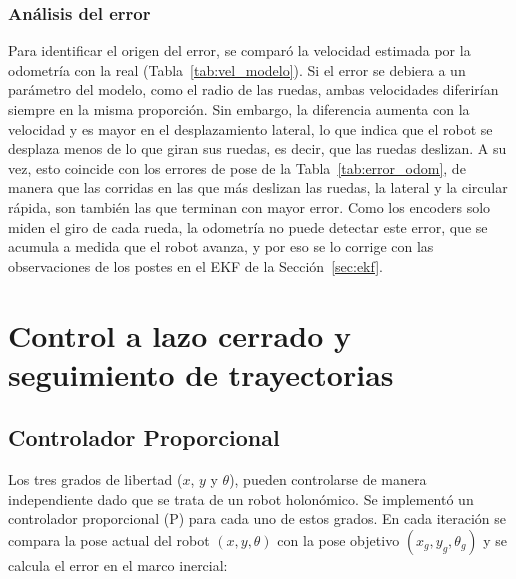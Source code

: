 \documentclass[11pt,a4paper]{article}
\begin{document}
\subsubsection{Análisis del error}

Para identificar el origen del error, se comparó la velocidad estimada por la odometría con la real (Tabla~\ref{tab:vel_modelo}). Si el error se debiera a un parámetro del modelo, como el radio de las ruedas, ambas velocidades diferirían siempre en la misma proporción. Sin embargo, la diferencia aumenta con la velocidad y es mayor en el desplazamiento lateral, lo que indica que el robot se desplaza menos de lo que giran sus ruedas, es decir, que las ruedas deslizan. A su vez, esto coincide con los errores de pose de la Tabla~\ref{tab:error_odom}, de manera que las corridas en las que más deslizan las ruedas, la lateral y la circular rápida, son también las que terminan con mayor error. Como los encoders solo miden el giro de cada rueda, la odometría no puede detectar este error, que se acumula a medida que el robot avanza, y por eso se lo corrige con las observaciones de los postes en el EKF de la Sección~\ref{sec:ekf}.

\section{Control a lazo cerrado y seguimiento de trayectorias}
\label{sec:lazo_cerrado}
\subsection{Controlador Proporcional}

Los tres grados de libertad ($x$, $y$ y $\theta$), pueden controlarse de manera independiente dado que se trata de un robot holonómico. Se implementó un controlador proporcional (P) para cada uno de estos grados. En cada iteración se compara la pose actual del robot $(x, y, \theta)$ con la pose objetivo $(x_g, y_g, \theta_g)$ y se calcula el error en el marco inercial:
\end{document}
